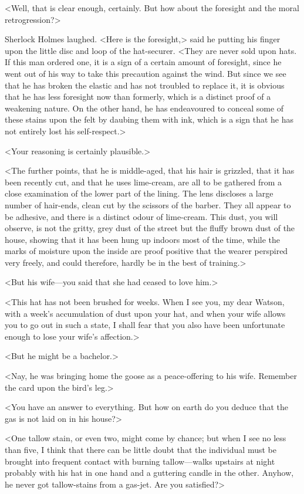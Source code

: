 <Well, that is clear enough, certainly. But how about the foresight and the moral retrogression?>

Sherlock Holmes laughed. <Here is the foresight,> said he putting his finger upon the little disc and loop of the hat-securer. <They are never sold upon hats. If this man ordered one, it is a sign of a certain amount of foresight, since he went out of his way to take this precaution against the wind. But since we see that he has broken the elastic and has not troubled to replace it, it is obvious that he has less foresight now than formerly, which is a distinct proof of a weakening nature. On the other hand, he has endeavoured to conceal some of these stains upon the felt by daubing them with ink, which is a sign that he has not entirely lost his self-respect.>

<Your reasoning is certainly plausible.>

<The further points, that he is middle-aged, that his hair is grizzled, that it has been recently cut, and that he uses lime-cream, are all to be gathered from a close examination of the lower part of the lining. The lens discloses a large number of hair-ends, clean cut by the scissors of the barber. They all appear to be adhesive, and there is a distinct odour of lime-cream. This dust, you will observe, is not the gritty, grey dust of the street but the fluffy brown dust of the house, showing that it has been hung up indoors most of the time, while the marks of moisture upon the inside are proof positive that the wearer perspired very freely, and could therefore, hardly be in the best of training.>

<But his wife—you said that she had ceased to love him.>

<This hat has not been brushed for weeks. When I see you, my dear Watson, with a week's accumulation of dust upon your hat, and when your wife allows you to go out in such a state, I shall fear that you also have been unfortunate enough to lose your wife's affection.>

<But he might be a bachelor.>

<Nay, he was bringing home the goose as a peace-offering to his wife. Remember the card upon the bird's leg.>

<You have an answer to everything. But how on earth do you deduce that the gas is not laid on in his house?>

<One tallow stain, or even two, might come by chance; but when I see no less than five, I think that there can be little doubt that the individual must be brought into frequent contact with burning tallow—walks upstairs at night probably with his hat in one hand and a guttering candle in the other. Anyhow, he never got tallow-stains from a gas-jet. Are you satisfied?>

